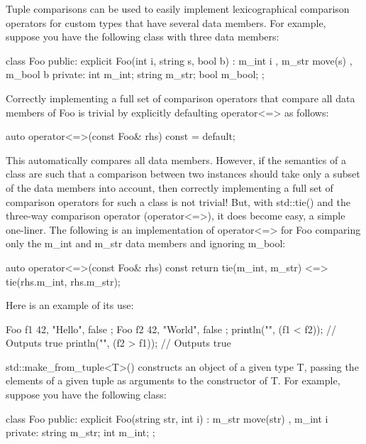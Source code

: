 Tuple comparisons can be used to easily implement lexicographical comparison operators for custom types that have several data members. For example, suppose you have the following class with three data members:

\begin{cpp}
class Foo
{
    public:
        explicit Foo(int i, string s, bool b)
            : m_int { i }, m_str { move(s) }, m_bool { b } { }
    private:
        int m_int;
        string m_str;
        bool m_bool;
};
\end{cpp}

Correctly implementing a full set of comparison operators that compare all data members of Foo is trivial by explicitly defaulting operator<=> as follows:

\begin{cpp}
auto operator<=>(const Foo& rhs) const = default;
\end{cpp}

This automatically compares all data members. However, if the semantics of a class are such that a comparison between two instances should take only a subset of the data members into account, then correctly implementing a full set of comparison operators for such a class is not trivial! But, with std::tie() and the three-way comparison operator (operator<=>), it does become easy, a simple one-liner. The following is an implementation of operator<=> for Foo comparing only the m\_int and m\_str data members and ignoring m\_bool:

\begin{cpp}
auto operator<=>(const Foo& rhs) const
{
    return tie(m_int, m_str) <=> tie(rhs.m_int, rhs.m_str);
}
\end{cpp}

Here is an example of its use:

\begin{cpp}
Foo f1 { 42, "Hello", false };
Foo f2 { 42, "World", false };
println("{}", (f1 < f2)); // Outputs true
println("{}", (f2 > f1)); // Outputs true
\end{cpp}


std::make\_from\_tuple<T>() constructs an object of a given type T, passing the elements of a given tuple as arguments to the constructor of T. For example, suppose you have the following class:

\begin{cpp}
class Foo
{
    public:
        explicit Foo(string str, int i) : m_str { move(str) }, m_int { i } { }
    private:
        string m_str;
        int m_int;
};
\end{cpp}

